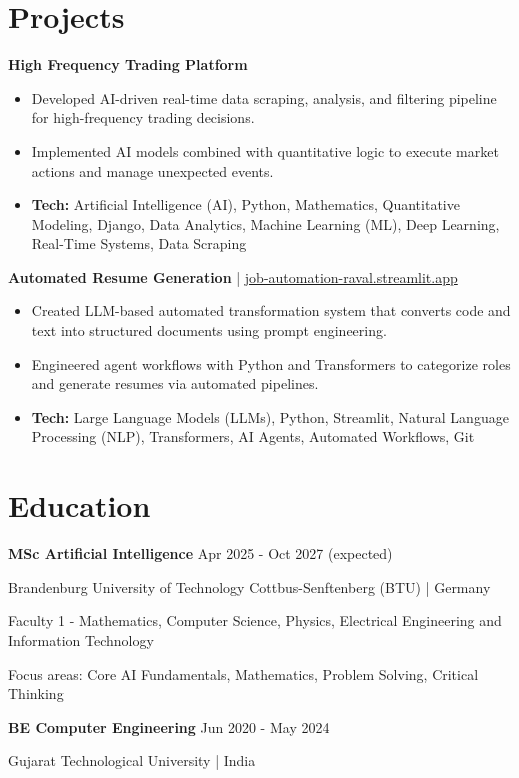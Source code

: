 \documentclass[a4paper,10pt]{article}
\begin{document}
\section*{Projects}
\textbf{High Frequency Trading Platform}\par
\begin{itemize}
\item Developed AI-driven real-time data scraping, analysis, and filtering pipeline for high-frequency trading decisions.
\item Implemented AI models combined with quantitative logic to execute market actions and manage unexpected events.
\item \textbf{Tech:} Artificial Intelligence (AI), Python, Mathematics, Quantitative Modeling, Django, Data Analytics, Machine Learning (ML), Deep Learning, Real-Time Systems, Data Scraping
\end{itemize}
\vspace{3pt}
\textbf{Automated Resume Generation} | \href{https://job-automation-raval.streamlit.app/}{job-automation-raval.streamlit.app}\par
\begin{itemize}
\item Created LLM-based automated transformation system that converts code and text into structured documents using prompt engineering.
\item Engineered agent workflows with Python and Transformers to categorize roles and generate resumes via automated pipelines.
\item \textbf{Tech:} Large Language Models (LLMs), Python, Streamlit, Natural Language Processing (NLP), Transformers, AI Agents, Automated Workflows, Git
\end{itemize}
\vspace{3pt}

\section*{Education}
\textbf{MSc Artificial Intelligence} \hfill Apr 2025 - Oct 2027 (expected)\par
Brandenburg University of Technology Cottbus-Senftenberg (BTU) | Germany\par
Faculty 1 - Mathematics, Computer Science, Physics, Electrical Engineering and Information Technology\par
Focus areas: Core AI Fundamentals, Mathematics, Problem Solving, Critical Thinking\par
\vspace{3pt}
\textbf{BE Computer Engineering} \hfill Jun 2020 - May 2024\par
Gujarat Technological University | India\par
\vspace{3pt}
\end{document}
